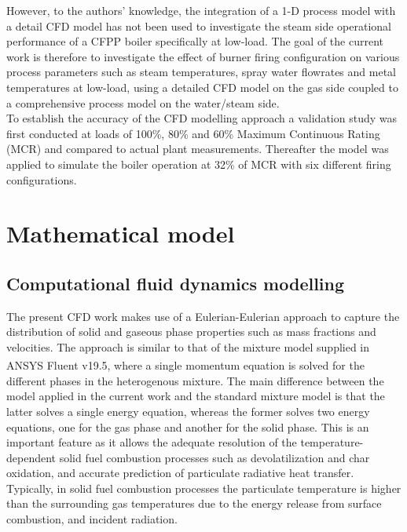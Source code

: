 \documentclass[11pt,cleanfoot]{asme2ej}
\begin{document}
However, to the authors’ knowledge, the integration of a 1-D process model with a detail CFD model has not been used to investigate the steam side operational performance of a CFPP boiler specifically at low-load. The goal of the current work is therefore to investigate the effect of burner firing configuration on various process parameters such as steam temperatures, spray water flowrates and metal temperatures at low-load, using a detailed CFD model on the gas side coupled to a comprehensive process model on the water/steam side.\\
To establish the accuracy of the CFD modelling approach a validation study was first conducted at loads of 100\%, 80\% and 60\% Maximum Continuous Rating (MCR) and compared to actual plant measurements. Thereafter the model was applied to simulate the boiler operation at 32\% of MCR with six different firing configurations.
\section{Mathematical model}
\subsection{Computational fluid dynamics modelling}
The present CFD work makes use of a Eulerian-Eulerian approach to capture the distribution of solid and gaseous phase properties such as mass fractions and velocities. The approach is similar to that of the mixture model supplied in ANSYS Fluent v19.5\textsuperscript{\textregistered}, where a single momentum equation is solved for the different phases in the heterogenous mixture. The main difference between the model applied in the current work and the standard mixture model is that the latter solves a single energy equation, whereas the former solves two energy equations, one for the gas phase and another for the solid phase. This is an important feature as it allows the adequate resolution of the temperature-dependent solid fuel combustion processes such as devolatilization and char oxidation, and accurate prediction of particulate radiative heat transfer. Typically, in solid fuel combustion processes the particulate temperature is higher than the surrounding gas temperatures due to the energy release from surface combustion, and incident radiation.
\end{document}

